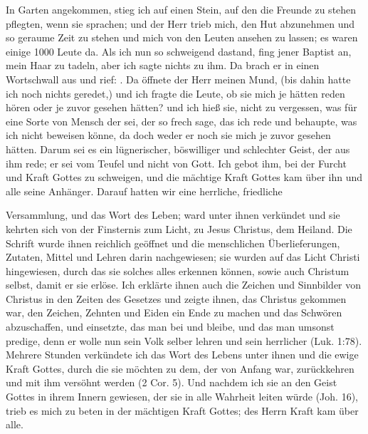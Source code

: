 In Garten angekommen, stieg ich auf
einen Stein, auf den die Freunde zu stehen pflegten, wenn sie
sprachen;
und der Herr trieb mich, den Hut abzunehmen und so
geraume Zeit zu stehen und mich von den Leuten ansehen zu
lassen; es waren einige 1000 Leute da. Als ich nun so schweigend
dastand, fing jener Baptist an, mein Haar zu 
tadeln, aber ich
sagte nichts zu ihm. Da brach er in einen Wortschwall aus und
rief: . Da öffnete der Herr meinen Mund, (bis
dahin hatte ich noch nichts geredet,) und ich fragte die Leute, ob
sie mich je hätten reden hören oder je zuvor gesehen hätten? und
ich hieß sie, nicht zu vergessen, was für eine Sorte von Mensch
der sei, der so frech sage, das ich rede und behaupte, was ich
nicht beweisen könne, da doch weder er noch sie mich je zuvor
gesehen hätten. Darum sei es ein lügnerischer, böswilliger und
schlechter Geist, der aus ihm rede; er sei vom 
Teufel und nicht
von Gott. Ich gebot ihm, bei der Furcht und Kraft Gottes zu
schweigen, und die mächtige Kraft Gottes kam über ihn und alle
seine Anhänger. Darauf hatten wir eine herrliche, friedliche 


Versammlung, und das Wort des Leben; ward unter ihnen verkündet
und sie kehrten sich von der Finsternis zum Licht, zu Jesus
Christus, dem Heiland. Die Schrift wurde ihnen reichlich 
geöffnet und die menschlichen Überlieferungen, Zutaten, Mittel und
Lehren darin nachgewiesen; sie wurden auf das Licht Christi 
hingewiesen, durch das sie solches alles erkennen können, sowie auch
Christum selbst, damit er sie erlöse. Ich erklärte ihnen auch die
Zeichen und Sinnbilder von Christus in den Zeiten des Gesetzes
und zeigte ihnen, das Christus gekommen war, den Zeichen,
Zehnten und Eiden ein Ende zu machen und das Schwören 
abzuschaffen, und einsetzte, das man bei  
und  bleibe,
und das man umsonst predige, denn er wolle nun sein Volk
selber lehren und sein herrlicher  (Luk. 1:78). Mehrere 
Stunden verkündete ich das
Wort des Lebens unter ihnen und die ewige Kraft Gottes, durch
die sie möchten zu dem, der von Anfang war, zurückkehren und
mit ihm versöhnt werden (2 Cor. 5). 
Und nachdem ich sie an den
Geist Gottes in ihrem Innern gewiesen, der sie in alle Wahrheit
leiten würde (Joh. 16), trieb es mich zu 
beten in der mächtigen
Kraft Gottes; des Herrn Kraft kam über alle. 



